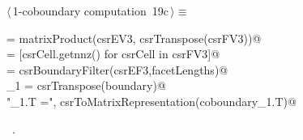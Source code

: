 \documentclass[11pt,oneside]{article}	%
\begin{document}
\begin{flushleft} \small
\begin{minipage}{\linewidth} \label{scrap41}
\protect{}$\langle\,$1-coboundary computation\nobreak\ {\footnotesize 19c}$\,\rangle\equiv$
\vspace{-1ex}
\begin{list}{}{} \item
\mbox{} = matrixProduct(csrEV3, csrTranspose(csrFV3))@\\
\mbox{}\verb@facetLengths = [csrCell.getnnz() for csrCell in csrFV3]@\\
\mbox{}\verb@boundary = csrBoundaryFilter(csrEF3,facetLengths)@\\
\mbox{}\verb@coboundary_1 = csrTranspose(boundary)@\\
\mbox{}\verb@print "\ncoboundary_1.T =\n", csrToMatrixRepresentation(coboundary_1.T)@\\
\mbox{}\verb@@{\NWsep}
\end{list}
\vspace{-1ex}
\footnotesize\addtolength{\baselineskip}{-1ex}
\begin{list}{}{\setlength{\itemsep}{-\parsep}\setlength{\itemindent}{-\leftmargin}}
\item \NWtxtMacroRefIn\ .
\end{list}
\end{minipage}\\[4ex]
\end{flushleft}
\end{document}

